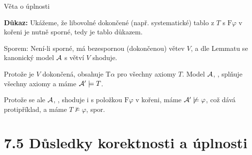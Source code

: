 \documentclass{beamer}
\begin{document}
\begin{frame}{Věta o úplnosti}

    \pause
    
    \smallskip

    \pause
    \textbf{Důkaz:} \pause
    Ukážeme, že libovolné dokončené (např. \alert{systematické}) tablo z $T$ s $\mathrm{F}\varphi$ v kořeni je nutně sporné, tedy je tablo důkazem.
    
    \pause
    Sporem: \alert{Není-li sporné}, má bezespornou (dokončenou) větev $V$, a dle Lemmatu se kanonický model $\mathcal{A}$ s větví $V$ shoduje. 
    
    \pause

    \pause
    Protože je $V$ dokončená, obsahuje $\mathrm{T}\alpha$ pro všechny axiomy $T$. Model $\mathcal{A}$, , splňuje všechny axiomy a máme \alert{$\mathcal{A}'\models T$}. 
    
    \pause
    Protože se ale $\mathcal{A}$, , shoduje i s položkou $\mathrm{F}\varphi$ v kořeni, máme \alert{$\mathcal{A}'\not\models\varphi$}, což dává protipříklad, a máme \alert{$T\not\models\varphi$}, spor.\hfill\qedsymbol

\end{frame}


\section{7.5 Důsledky korektnosti a úplnosti}
\end{document}
